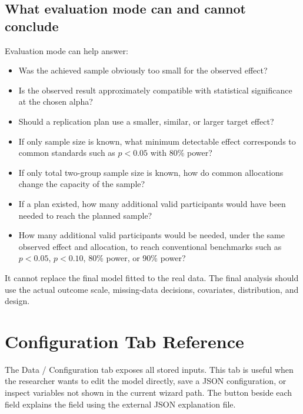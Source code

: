 \documentclass[11pt,a4paper,oneside]{report}
\newcommand{\code}[1]{\texttt{\detokenize{#1}}}
\begin{document}
\section{What evaluation mode can and cannot conclude}

Evaluation mode can help answer:

\begin{itemize}
  \item Was the achieved sample obviously too small for the observed effect?
  \item Is the observed result approximately compatible with statistical significance at the chosen alpha?
  \item Should a replication plan use a smaller, similar, or larger target effect?
  \item If only sample size is known, what minimum detectable effect corresponds to common standards such as \(p<0.05\) with 80\% power?
  \item If only total two-group sample size is known, how do common allocations change the capacity of the sample?
  \item If a plan existed, how many additional valid participants would have been needed to reach the planned sample?
  \item How many additional valid participants would be needed, under the same observed effect and allocation, to reach conventional benchmarks such as \(p<0.05\), \(p<0.10\), 80\% power, or 90\% power?
\end{itemize}

It cannot replace the final model fitted to the real data. The final analysis should use the actual outcome scale, missing-data decisions, covariates, distribution, and design.

\chapter{Configuration Tab Reference}

The Data / Configuration tab exposes all stored inputs. This tab is useful when the researcher wants to edit the model directly, save a JSON configuration, or inspect variables not shown in the current wizard path. The \code{?} button beside each field explains the field using the external JSON explanation file.
\end{document}
